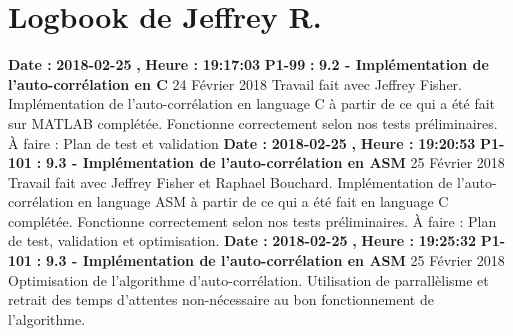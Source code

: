 \documentclass{article}%
\begin{document}
\section{Logbook de Jeffrey R.}%
\textbf{Date : }%
\textbf{2018{-}02{-}25}%
\textbf{,}%
\textbf{ Heure : }%
\textbf{19:17:03}%
\newline%
%
\textbf{P1{-}99 }%
\textbf{ : }%
\textbf{ 9.2 {-} Implémentation de l'auto{-}corrélation en C}%
\newline%
\newline%
%
24 Février 2018\newline%
Travail fait avec Jeffrey Fisher.\newline%
Implémentation de l'auto{-}corrélation en language C à partir de ce qui a été fait sur MATLAB complétée.\newline%
Fonctionne correctement selon nos tests préliminaires.\newline%
À faire : Plan de test et validation\newline%
\newline%
%
\textbf{Date : }%
\textbf{2018{-}02{-}25}%
\textbf{,}%
\textbf{ Heure : }%
\textbf{19:20:53}%
\newline%
%
\textbf{P1{-}101 }%
\textbf{ : }%
\textbf{ 9.3 {-} Implémentation de l'auto{-}corrélation en ASM}%
\newline%
\newline%
%
25 Février 2018\newline%
Travail fait avec Jeffrey Fisher et Raphael Bouchard.\newline%
Implémentation de l'auto{-}corrélation en language ASM à partir de ce qui a été fait en language C complétée.\newline%
Fonctionne correctement selon nos tests préliminaires.\newline%
À faire : Plan de test, validation et optimisation.\newline%
\newline%
%
\textbf{Date : }%
\textbf{2018{-}02{-}25}%
\textbf{,}%
\textbf{ Heure : }%
\textbf{19:25:32}%
\newline%
%
\textbf{P1{-}101 }%
\textbf{ : }%
\textbf{ 9.3 {-} Implémentation de l'auto{-}corrélation en ASM}%
\newline%
\newline%
%
25 Février 2018\newline%
Optimisation de l'algorithme d'auto{-}corrélation. Utilisation de parrallèlisme et retrait des temps d'attentes non{-}nécessaire au bon fonctionnement de l'algorithme.\newline%
\end{document}
